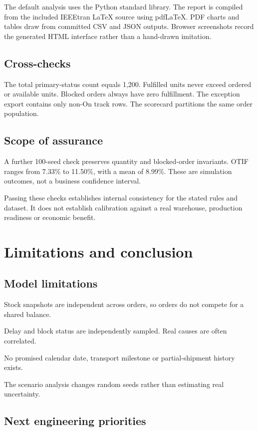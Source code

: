 \documentclass[conference,letterpaper]{IEEEtran}
\begin{document}
The default analysis uses the Python standard library. The report is compiled from the included IEEEtran LaTeX source using pdfLaTeX. PDF charts and tables draw from committed CSV and JSON outputs. Browser screenshots record the generated HTML interface rather than a hand-drawn imitation.


\subsection{Cross-checks}

The total primary-status count equals 1,200. Fulfilled units never exceed ordered or available units. Blocked orders always have zero fulfillment. The exception export contains only non-On track rows. The scorecard partitions the same order population.


\subsection{Scope of assurance}

A further 100-seed check preserves quantity and blocked-order invariants. OTIF ranges from 7.33\% to 11.50\%, with a mean of 8.99\%. These are simulation outcomes, not a business confidence interval.

Passing these checks establishes internal consistency for the stated rules and dataset. It does not establish calibration against a real warehouse, production readiness or economic benefit.


\section{Limitations and conclusion}

\subsection{Model limitations}

\textbullet{} Stock snapshots are independent across orders, so orders do not compete for a shared balance.


\textbullet{} Delay and block status are independently sampled. Real causes are often correlated.


\textbullet{} No promised calendar date, transport milestone or partial-shipment history exists.


\textbullet{} The scenario analysis changes random seeds rather than estimating real uncertainty.


\subsection{Next engineering priorities}
\end{document}
